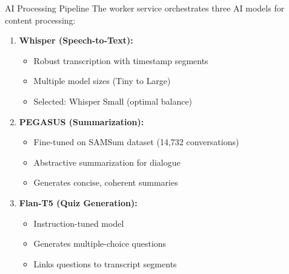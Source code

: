\documentclass{beamer}
\begin{document}
\begin{frame}{AI Processing Pipeline}
    The worker service orchestrates three AI models for content processing:
    
    \begin{enumerate}
        \item \textbf{Whisper (Speech-to-Text):}
            \begin{itemize}
                \item Robust transcription with timestamp segments
                \item Multiple model sizes (Tiny to Large)
                \item Selected: Whisper Small (optimal balance)
            \end{itemize}
        
        \item \textbf{PEGASUS (Summarization):}
            \begin{itemize}
                \item Fine-tuned on SAMSum dataset (14,732 conversations)
                \item Abstractive summarization for dialogue
                \item Generates concise, coherent summaries
            \end{itemize}
        
        \item \textbf{Flan-T5 (Quiz Generation):}
            \begin{itemize}
                \item Instruction-tuned model
                \item Generates multiple-choice questions
                \item Links questions to transcript segments
            \end{itemize}
    \end{enumerate}
\end{frame}
\end{document}
